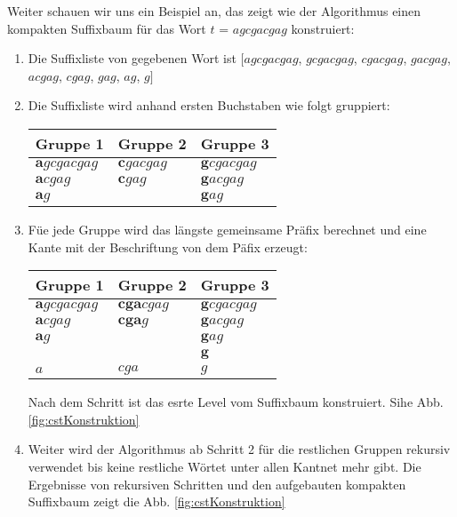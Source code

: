 \documentclass[12pt]{report}
\begin{document}
Weiter schauen wir uns ein Beispiel an, das zeigt wie der Algorithmus einen kompakten Suffixbaum für das Wort $t$ = $agcgacgag$ konstruiert:
\begin{enumerate}
    \item Die Suffixliste von gegebenen Wort ist $[agcgacgag$, $gcgacgag$, $cgacgag$, $gacgag$, $acgag$, $cgag$, $gag$, $ag$, $g]$
    \item Die Suffixliste wird anhand ersten Buchstaben wie folgt gruppiert:
        \begin{center}
        \begin{tabular}{l l l}
            \toprule
            Gruppe 1                 & Gruppe 2               & Gruppe 3                \\
            \midrule
            $\boldsymbol{a}gcgacgag$ & $\boldsymbol{c}gacgag$ & $\boldsymbol{g}cgacgag$ \\
            $\boldsymbol{a}cgag$     & $\boldsymbol{c}gag$    & $\boldsymbol{g}acgag$   \\
            $\boldsymbol{a}g$        &                        & $\boldsymbol{g}ag$      \\
            \bottomrule
        \end{tabular}
        \end{center}
    \item Füe jede Gruppe wird das längste gemeinsame Präfix berechnet und eine Kante mit der Beschriftung von dem Päfix erzeugt:
        \begin{center}
        \begin{tabular}{l l l}
            \toprule
            Gruppe 1                 & Gruppe 2               & Gruppe 3                \\
            \midrule
            $\boldsymbol{a}gcgacgag$ & $\boldsymbol{cga}cgag$ & $\boldsymbol{g}cgacgag$ \\
            $\boldsymbol{a}cgag$     & $\boldsymbol{cga}g$    & $\boldsymbol{g}acgag$   \\
            $\boldsymbol{a}g$        &                        & $\boldsymbol{g}ag$      \\
                                     &                        & $\boldsymbol{g}$        \\
            \midrule
            $a$                      & $cga$                  & $g$                     \\
            \bottomrule
        \end{tabular}
        \end{center}
        Nach dem Schritt ist das esrte Level vom Suffixbaum konstruiert. Sihe Abb. \ref{fig:cstKonstruktion}
    \item Weiter wird der Algorithmus ab Schritt 2 für die restlichen Gruppen rekursiv verwendet bis keine restliche Wörtet unter allen Kantnet mehr gibt. Die Ergebnisse von rekursiven Schritten und den aufgebauten kompakten Suffixbaum zeigt die Abb. \ref{fig:cstKonstruktion}
\end{enumerate}
\end{document}
